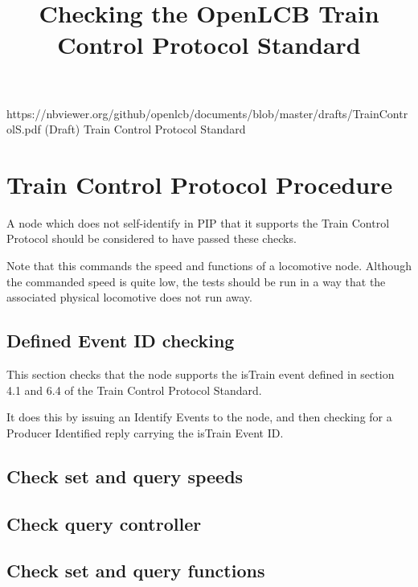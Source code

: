 

\title{Checking the OpenLCB Train Control Protocol Standard}


\maketitle


\introductionCaveats
    {https://nbviewer.org/github/openlcb/documents/blob/master/drafts/TrainControlS.pdf}
    {(Draft) Train Control Protocol Standard}

\section{Train Control Protocol Procedure}


A node which does not self-identify in PIP that it supports
the Train Control Protocol should be considered to have passed these checks.
\pipsetFootnote

Note that this commands the speed and functions of a locomotive node.
Although the commanded speed is quite low, the
tests should be run in a way that the associated physical locomotive
does not run away.

\subsection{Defined Event ID checking}

This section checks that the node supports the isTrain event
defined in section 4.1 and 6.4 of the Train Control Protocol Standard.

It does this by issuing an Identify Events to the node, and then
checking for a Producer Identified reply carrying the isTrain Event ID.

\subsection{Check set and query speeds}

\subsection{Check query controller}

\subsection{Check set and query functions}

